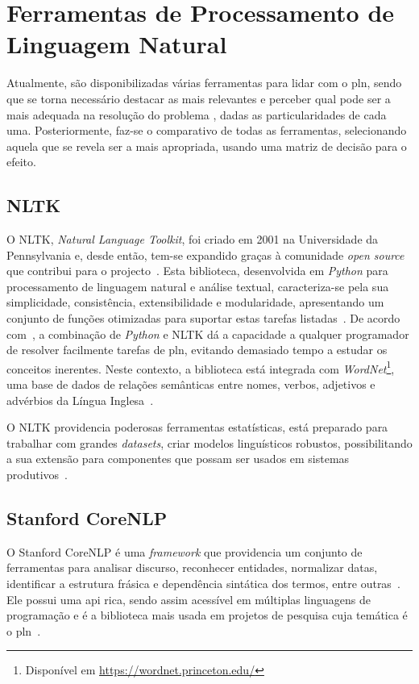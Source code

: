 \section{Ferramentas de Processamento de Linguagem Natural}
\label{sec:chap03_existingtools}
Atualmente, são disponibilizadas várias ferramentas para lidar com o \gls{pln}, sendo que se torna necessário destacar as mais relevantes e perceber qual pode ser a mais adequada na resolução do problema , dadas as particularidades de cada uma. Posteriormente, faz-se o comparativo de todas as ferramentas, selecionando aquela que se revela ser a mais apropriada, usando uma matriz de decisão para o efeito.

\subsection{NLTK}
O NLTK, \textit{Natural Language Toolkit}, foi criado em 2001 na Universidade da Pennsylvania e, desde então, tem-se expandido graças à comunidade \textit{open source} que contribui para o projecto~\parencite{applied_natural_language_processing_with_python}. Esta biblioteca, desenvolvida em \textit{Python} para processamento de linguagem natural e análise textual, caracteriza-se pela sua simplicidade, consistência, extensibilidade e modularidade, apresentando um conjunto de funções otimizadas para suportar estas tarefas listadas~\parencite{applied_natural_language_processing_with_python, python_text_processing_nltk_cookbook}. De acordo com~\textcite{nltk_education_scientific_purposes}, a combinação de \textit{Python} e NLTK dá a capacidade a qualquer programador de resolver facilmente tarefas de \gls{pln}, evitando demasiado tempo a  estudar os conceitos inerentes. Neste contexto, a biblioteca está integrada com \textit{WordNet}\footnote{Disponível em \url{https://wordnet.princeton.edu/}}, uma base de dados de relações semânticas entre nomes, verbos, adjetivos e advérbios da Língua Inglesa~\parencite{nltk_education_scientific_purposes}.

O NLTK providencia poderosas ferramentas estatísticas, está preparado para trabalhar com grandes \textit{datasets}, criar modelos linguísticos robustos, possibilitando a sua extensão para componentes que possam ser usados em sistemas produtivos~\parencite{nltk_education_scientific_purposes, applied_natural_language_processing_with_python}.

\subsection{Stanford CoreNLP}
O Stanford CoreNLP é uma \textit{framework} que providencia um conjunto de ferramentas para analisar discurso, reconhecer entidades, normalizar datas, identificar a estrutura frásica e dependência sintática dos termos, entre outras~\parencite{stanford_open_nlp}. Ele possui uma \gls{api} rica, sendo assim acessível em múltiplas linguagens de programação e é a biblioteca mais usada em projetos de pesquisa cuja temática é o \gls{pln}~\parencite{stanford_open_nlp, choosing_nlp_library}.

